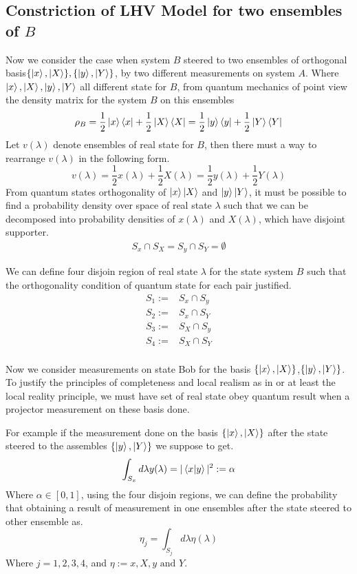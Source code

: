 \subsection{ Constriction of LHV Model for two ensembles of $B$}\label{Triv}\hfill \break
Now we consider the case when system $B$ steered to two ensembles of orthogonal basis$\{\ket{x},\ket{X}\},\{\ket{y},\ket{Y}\}$, by two different measurements on system $A$.
Where $\ket{x},\ket{X},\ket{y},\ket{Y}$ all different state for $B$,  from quantum mechanics of point view the density matrix for  the system $B$ on this ensembles
\begin{equation}\label{STTS}
\rho_B=\frac{1}{2}\ket{x}\bra{x}+\frac{1}{2}\ket{X}\bra{X}=\frac{1}{2}\ket{y}\bra{y}+\frac{1}{2}\ket{Y}\bra{Y}
\end{equation}
Let $v(\lambda)$ denote ensembles of real state for $B$, then there must a way to rearrange $v(\lambda)$ in the following form.
\begin{equation}\label{Hidden}
v(\lambda)=\frac{1}{2}x(\lambda)+\frac{1}{2}X(\lambda)=\frac{1}{2}y(\lambda)+\frac{1}{2}Y(\lambda)
\end{equation}
From quantum states orthogonality of $\ket{x} \ket{X}$ and  $\ket{y} \ket{Y}$, it must be possible to find a probability density over space of real state $\lambda$ such that we can be decomposed into probability densities of $x(\lambda)$ and $X(\lambda)$, which have disjoint supporter.
\begin{align*}
S_x\cap S_X=S_y\cap S_Y=\emptyset
\end{align*}

We can define four disjoin region of real state $\lambda$ for the state system $B$  such that the orthogonality condition of quantum state for each pair justified.
\begin{align*}
S_1:=&S_x\cap S_y\\
S_2:=&S_x\cap S_Y\\
S_3:=&S_X\cap S_y\\
S_4:=&S_X\cap S_Y\\
\end{align*}


Now we consider measurements on state Bob for the basis $\{\ket{x},\ket{X}\}$,$\{\ket{y},\ket{Y}\}$. To justify the principles of completeness and local realism as in  \citep{EPR} or at least the local reality principle, we must have set of real state obey quantum result when a projector measurement on these basis done.

For example if the measurement done on the basis $\{\ket{x},\ket{X}\}$ after the state steered to the assembles $\{\ket{y},\ket{Y}\}$ we suppose to get.
\begin{equation}
\int_{S_x} d\lambda y(\lambda)=|\bra{x}\ket{y}|^2:=\alpha
\end{equation}
Where $\alpha \in [0,1]$, using  the four disjoin regions, we can define the probability that obtaining a result of measurement in one ensembles after the state steered to other ensemble as.
\begin{equation}
\eta_j=\int_{S_j} d\lambda \eta(\lambda)
\end{equation}
Where $j=1,2,3,4$, and $\eta:= x,X,y \text{ and } Y$.

